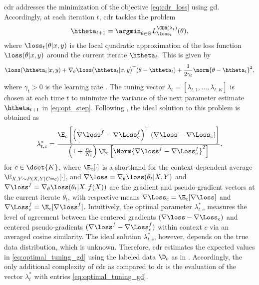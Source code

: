 \documentclass[journal]{IEEEtran}
\begin{document}
\gls{cdr} addresses the minimization of the objective \eqref{eq:cdr_loss} using \gls{gd}.
Accordingly, at each iteration $t$, \gls{cdr} tackles the problem
\begin{equation}
\label{eq:opt_step}
    \htheta_{t+1} = \argmin_{\theta \in \Theta} L^{\CDR(\lambda_t)}_{\loss_t}(\theta),
\end{equation}
where $\loss_t(\theta| x, y)$ is the local quadratic approximation of the loss function $\loss(\theta| x, y)$ around the current iterate $\htheta_t$.
This is given by
\begin{equation}
\label{eq:gd_loss_approx}
    \loss(\htheta_t | x, y) + \nabla_\theta \loss(\htheta_t | x, y)^\top (\theta - \htheta_t) + \frac{1}{2 \gamma_t} \norm{\theta - \htheta_t}^2,
\end{equation}
where $\gamma_t > 0$ is the learning rate \cite{simeone2022machine}. %
The tuning vector $\lambda_t = [\lambda_{t, 1}, ..., \lambda_{t, K}]$ is chosen at each time $t$ to minimize the variance of the next parameter estimate $\htheta_{t+1}$ in \eqref{eq:opt_step}.
Following \cite[Prop.~2]{fisch2024stratified}, the ideal solution to this problem is obtained as
\begin{equation}
\label{eq:optimal_tuning_gd}
\lambda^{*}_{t, c} = \frac{
        \E_c\left[
            \left( \nabla \loss^f - \nabla \Loss^f_c \right)^\top
            \left( \nabla \loss - \nabla \Loss_c \right)
        \right]
    }{
        \left( 1 + \frac{n_c}{N_c} \right) \E_c\left[
            \Norm{\nabla \loss^f - \nabla \Loss^f_c}^2
        \right]
    },
\end{equation}
for $c \in \dset{K}$, where $\E_c[\cdot]$ is a shorthand for the context-dependent average $\E_{X, Y \sim P(X, Y | C=c)}[\cdot]$, and $\nabla \loss = \nabla_\theta \loss(\theta_t | X, Y)$ and $\nabla \loss^f = \nabla_\theta \loss(\theta_t | X, f(X))$ are the gradient and pseudo-gradient vectors at the current iterate $\theta_t$, with respective means $\nabla \Loss_c = \E_c[\nabla \loss]$ and $\nabla \Loss^f_c = \E_c[\nabla \loss^f]$.
Intuitively, the optimal parameter $\lambda^{*}_{t, c}$ measures the level of agreement between the centered gradients $(\nabla \loss - \nabla \Loss_c)$ and centered pseudo-gradients $(\nabla \loss^f - \nabla \Loss^f_c)$ within context $c$ via an averaged cosine similarity.
The ideal solution $\lambda^{*}_{t, c}$, however, depends on the true data distribution, which is unknown.
Therefore, \gls{cdr} estimates the expected values in \eqref{eq:optimal_tuning_gd} using the labeled data $\D_c$ as in \cite{fisch2024stratified}. %
Accordingly, the only additional complexity of \gls{cdr} as compared to \gls{dr} is the evaluation of the vector $\lambda^{*}_t$ with entries \eqref{eq:optimal_tuning_gd}.
\end{document}
